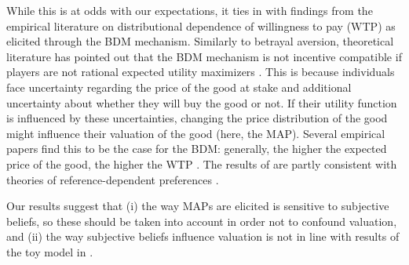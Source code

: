 While this is at odds with our expectations, it ties in with findings from the empirical literature on distributional dependence of willingness to pay (WTP) as elicited through the BDM mechanism.
Similarly to betrayal aversion, theoretical literature has pointed out that the BDM mechanism is not incentive compatible if players are not rational expected utility maximizers \citep{Karni1987,Horowitz2006}.
This is because individuals face uncertainty regarding the price of the good at stake and additional uncertainty about whether they will buy the good or not.
If their utility function is influenced by these uncertainties, changing the price distribution of the good might influence their valuation of the good (here, the MAP).
Several empirical papers find this to be the case for the BDM: generally, the higher the expected price of the good, the higher the WTP \citep[for a short review of this literature, see][]{Tymula2016}.
The results of \cite{Tymula2016} are partly consistent with theories of reference-dependent preferences \citep{Koszegi2006, Koszegi2007, Wenner2015}.




Our results suggest that (i) the way MAPs are elicited is sensitive to subjective beliefs, so these should be taken into account in order not to confound valuation, and (ii) the way subjective beliefs influence valuation is not in line with results of the toy model in \cite{Li2020a}.


